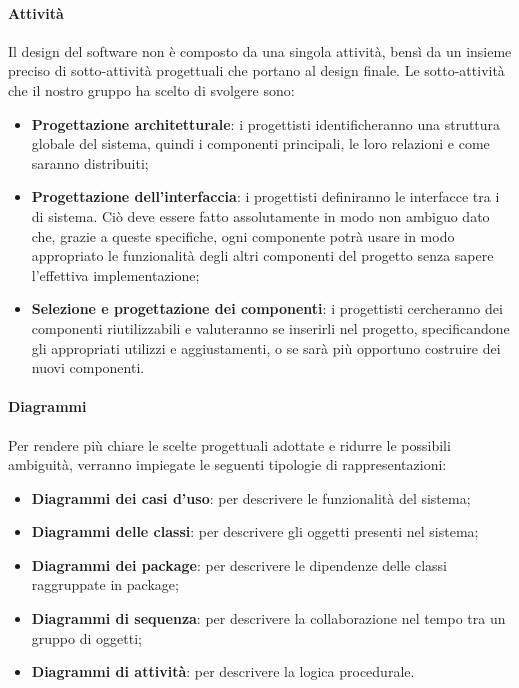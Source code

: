 \paragraph{Attività}\Spazio
Il design del software non è composto da una singola attività, bensì da un insieme preciso di sotto-attività progettuali che portano al design finale.
Le sotto-attività che il nostro gruppo ha scelto di svolgere sono:
	\begin{itemize}
	\item\textbf{{Progettazione architetturale}}: i progettisti identificheranno una struttura globale del sistema, quindi i componenti principali, le loro relazioni e come saranno distribuiti;
	\item\textbf{{Progettazione dell'interfaccia}}: i progettisti definiranno le interfacce tra i  di sistema. Ciò deve essere fatto assolutamente in modo non ambiguo dato che, grazie a queste specifiche, ogni componente potrà usare in modo appropriato le funzionalità degli altri componenti del progetto senza sapere l'effettiva implementazione;
	\item\textbf{{Selezione e progettazione dei componenti}}: i progettisti cercheranno dei componenti riutilizzabili e valuteranno se inserirli nel progetto, specificandone gli appropriati utilizzi e aggiustamenti, o se sarà più opportuno costruire dei nuovi componenti.
\end{itemize}
\paragraph{Diagrammi}\Spazio
Per rendere più chiare le scelte progettuali adottate e ridurre le possibili
ambiguità, verranno impiegate le seguenti tipologie di rappresentazioni:
\begin{itemize}
	\item \textbf{Diagrammi dei casi d’uso}: per descrivere le funzionalità del sistema;
	\item \textbf{Diagrammi delle classi}: per descrivere gli oggetti presenti nel sistema;
	\item \textbf{Diagrammi dei package}: per descrivere le dipendenze delle classi raggruppate in package;
	\item \textbf{Diagrammi di sequenza}: per descrivere la collaborazione nel tempo
	tra un gruppo di oggetti;

	\item \textbf{Diagrammi di attività}: per descrivere la logica procedurale.
\end{itemize}
